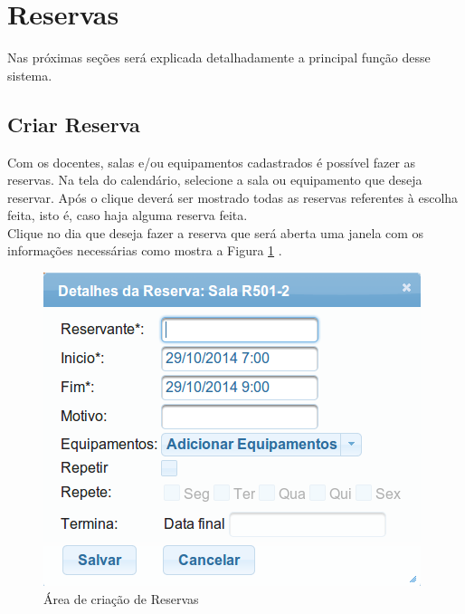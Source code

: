 \documentclass[openany,10pt,a4paper]{book}
\begin{document}
\section{Reservas}

Nas próximas seções será explicada detalhadamente a principal função desse sistema. 

\subsection{Criar Reserva}

Com os docentes, salas e/ou equipamentos cadastrados é possível fazer as reservas. Na tela do calendário, selecione a sala ou equipamento que deseja reservar. Após o clique deverá ser mostrado todas as reservas referentes à escolha feita, isto é, caso haja alguma reserva feita.\\
Clique no dia que deseja fazer a reserva que será aberta uma janela com os informações necessárias como mostra a Figura \ref{im_criarReserva} .

\begin{figure}[!htb]
    \centering
    \includegraphics[scale=0.5]{criarReserva.png}
    \caption{Área de criação de Reservas}
    \label{im_criarReserva}
\end{figure}
\end{document}
